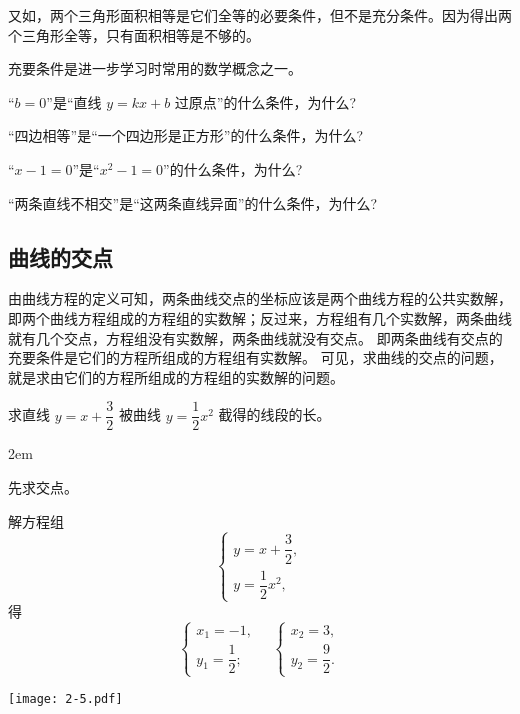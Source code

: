 又如，两个三角形面积相等是它们全等的必要条件，但不是充分条件。因为得出两个三角形全等，只有面积相等是不够的。

充要条件是进一步学习时常用的数学概念之一。
\begin{Practice}
  \begin{question}
    \item “$b=0$”是“直线 $y=kx+b$ 过原点”的什么条件，为什么?
    \item “四边相等”是“一个四边形是正方形”的什么条件，为什么?
    \item “$x-1=0$”是“$x^2-1=0$”的什么条件，为什么?
    \item “两条直线不相交”是“这两条直线异面”的什么条件，为什么?
  \end{question}
\end{Practice}

\subsection{曲线的交点}
由曲线方程的定义可知，两条曲线交点的坐标应该是两个曲线方程的公共实数解，即两个曲线方程组成的方程组的实数解；反过来，方程组有几个实数解，两条曲线就有几个交点，方程组没有实数解，两条曲线就没有交点。
即两条曲线有交点的充要条件是它们的方程所组成的方程组有实数解。
可见，求曲线的交点的问题，就是求由它们的方程所组成的方程组的实数解的问题。

\begin{example}
  求直线 $y=x+\dfrac{3}{2}$ 被曲线 $y=\dfrac{1}{2}x^2$ 截得的线段的长。
\end{example}

\noindent
\begin{minipage}{0.6\linewidth}\parindent2em
\begin{solution}
  先求交点。

  解方程组
  \[ \begin{cases} y=x+\dfrac{3}{2},\\y=\dfrac{1}{2}x^2, \end{cases}\]
  得
  \[ \begin{cases} x_1=-1,\\y_1=\dfrac{1}{2}; \end{cases} \quad \begin{cases} x_2=3,\\ y_2=\dfrac{9}{2}.\end{cases}\]
\end{solution}
\end{minipage}\hfill
\begin{minipage}{0.35\linewidth}\centering
  \begin{figurehere}
    \texttt{[image: 2-5.pdf]}
    \caption{}\label{fig:2-5}
  \end{figurehere}
\end{minipage}

